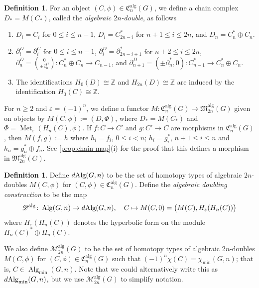 \documentclass[11pt,a4paper,leqno]{amsart}
\theoremstyle{definition}
\newtheorem{definition}[theorem]{Definition}
\theoremstyle{remark}
\newcommand{\Z}{\mathbb{Z}}
\DeclareMathOperator{\Alg}{Alg}
\DeclareMathOperator{\alg}{alg}
\newcommand{\dAlg}{d\text{\normalfont Alg}}
\newcommand{\Malg}{\mathscr{M}^{\alg}}
\newcommand{\dalg}{\mathscr{D}^{\alg}}
\DeclareMathOperator{\Met}{Met}
\newcommand{\ep}{\varepsilon}
\newcommand{\bd}{\partial}
\begin{document}
\begin{definition}\label{def:algdouble}
For an object $(C, \phi) \in \mathfrak{C}^{\alg}_n(G)$, we define a chain complex
$D_* = M(C_*)$, called the \textit{algebraic $2n$-double}, as follows
\begin{enumerate}
\item $D_i = C_i$ for $0 \leq i \leq n-1$, $D_i = C_{2n-i}^*$ for $n+1 \le i \le 2n$, and $D_n= C_n^* \oplus C_n$.
\item 
$\bd^D_i = \bd^C_i$ for $0 \leq i \leq n-1$, $\bd^D_i = \bd^*_{2n-i+1}$ for $n+2 \leq i \leq 2n$, \\ $\bd^D_{n} = \binom{0}{\pm \bd^C_n} \colon   C_n^* \oplus C_n \to  C_{n-1}$, and $\bd^D_{n+1} = (\pm \bd^*_{n}, 0) \colon C^*_{n-1} \to C_n^* \oplus C_n$.
\item
The identifications $H_0(D) \cong \Z$ and $H_{2n}(D) \cong \Z$ are induced by the identification $H_0(C) \cong \Z$.
\end{enumerate}

For $n \geq 2$ and $\ep = (-1)^n$, we define
a functor $M \colon \mathfrak{C}^{\alg}_n(G) \to \mathfrak{M}^{\alg}_{2n}(G)$ given on objects by $M(C, \phi) := (D, \Phi)$, where $D_* = M(C_*)$ and $\Phi = \Met_\ep( H_n(C), \phi)$.
If $f \colon C \to C'$ and $g\colon C' \to C$ are morphisms in $\mathfrak{C}^{\alg}_n(G)$, then $M(f,g) := h$ where $h_i = f_i$, $0 \leq i <n$; $h_i = g^*_i$, $n+1 \leq i \leq n$ and $h_n = g_n^* \oplus f_n$. 
See \cref{prop:chain-map}(i) for the proof that this defines a morphism in $\mathfrak{M}^{\alg}_{2n}(G)$.
\end{definition}

\begin{definition} \label{def:Dalg} 
Define $\dAlg(G,n)$ to be the set of homotopy types of algebraic $2n$-doubles $M(C, \phi)$ for $(C, \phi) \in \mathfrak{C}^{\alg}_n(G)$. Define the \textit{algebraic doubling construction} to be the map
\[ \dalg\colon\Alg(G,n) \to \dAlg(G,n), \quad C \mapsto M(C,0) = \big (M(C),H_\ep(H_n(C))\big ) \]
where $H_\ep(H_n(C))$ denotes the hyperbolic form on the module $H_n(C)^* \oplus H_n(C)$.

We also define $\Malg_{2n}(G)$ to be the set of homotopy types of algebraic $2n$-doubles $M(C, \phi)$ for $(C, \phi) \in \mathfrak{C}^{\alg}_n(G)$ such that $(-1)^n\chi(C) = \chi_{\min}(G,n)$; that is, $C \in \Alg_{\min}(G,n)$. Note that we could alternatively write this as $\dAlg_{\min}(G,n)$, but we use $\Malg_{2n}(G)$ to simplify notation.
\end{definition}
\end{document}
